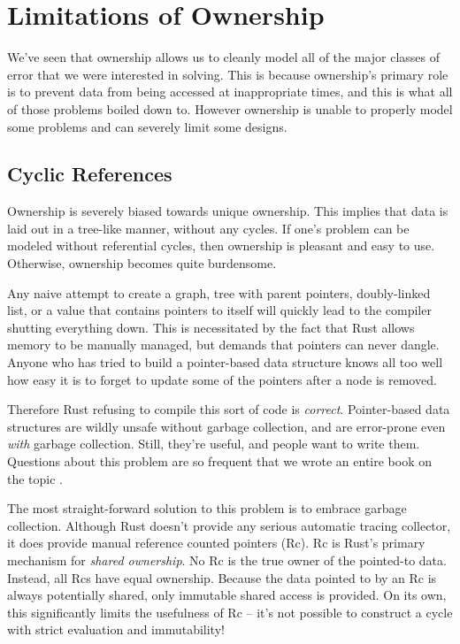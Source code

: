 \chapter{Limitations of Ownership}
\label{ch:limits}


We've seen that ownership allows us to cleanly model all of the major classes
of error that we were interested in solving. This is because ownership's primary
role is to prevent data from being accessed at inappropriate times, and this is
what all of those problems boiled down to. However ownership is unable to
properly model some problems and can severely limit some designs.





\section{Cyclic References}

Ownership is severely biased towards unique ownership. This implies that data
is laid out in a tree-like manner, without any cycles. If one's problem can
be modeled without referential cycles, then ownership is pleasant and easy to
use. Otherwise, ownership becomes quite burdensome.

Any naive attempt to create a graph, tree with parent pointers, doubly-linked
list, or a value that contains pointers to itself will quickly lead to the
compiler shutting everything down. This is necessitated by the fact that Rust
allows memory to be manually managed, but demands that pointers can never dangle.
Anyone who has tried to build a pointer-based data structure knows all too well
how easy it is to forget to update some of the pointers after a node is removed.

Therefore Rust refusing to compile this sort of code is \emph{correct}. Pointer-based
data structures are wildly unsafe without garbage collection, and are error-prone
even \emph{with} garbage collection. Still, they're useful, and people want to write
them. Questions about this problem are so frequent that we wrote an entire book
on the topic \cite{too-many-lists}.

The most straight-forward solution to this problem is to embrace garbage collection.
Although Rust doesn't provide any serious automatic tracing collector, it does
provide manual reference counted pointers (Rc). Rc is Rust's primary mechanism for
\emph{shared ownership}. No Rc is the true owner of the pointed-to data. Instead,
all Rcs have equal ownership. Because the data pointed to by an Rc is always
potentially shared, only immutable shared access is provided. On its own,
this significantly limits the usefulness of Rc -- it's not possible to construct
a cycle with strict evaluation and immutability!

